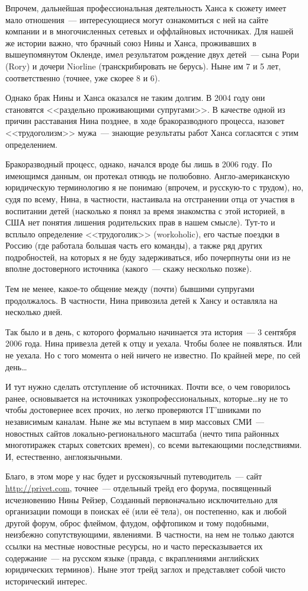 Впрочем, дальнейшая профессиональная деятельность Ханса к сюжету имеет мало отношения~--- интересующиеся могут ознакомиться с ней на сайте компании и в многочисленных сетевых и оффлайновых источниках. Для нашей же истории важно, что брачный союз Нины и Ханса, проживавших в вышеупомянутом Окленде, имел результатом рождение двух детей~--- сына Рори (Rory) и дочери Niorline (транскрибировать не берусь). Ныне им 7 и 5 лет, соответственно (точнее, уже скорее 8 и 6). 

Однако брак Нины и Ханса оказался не таким долгим. В 2004 году они становятся <<раздельно проживающими супругами>>. В качестве одной из причин расставания Нина позднее, в ходе бракоразводного процесса, назовет <<трудоголизм>> мужа~--- знающие результаты работ Ханса согласятся с этим определением. 

Бракоразводный процесс, однако, начался вроде бы лишь в 2006 году. По имеющимся данным, он протекал отнюдь не полюбовно. Англо-американскую юридическую терминологию я не понимаю (впрочем, и русскую-то с трудом), но, судя по всему, Нина, в частности, настаивала на отстранении отца от участия в воспитании детей (насколько я понял за время знакомства с этой историей, в США нет понятия лишения родительских прав в нашем смысле). Тут-то и всплыло определение <<трудоголик>> (workoholic), его частые поездки в Россию (где работала большая часть его команды), а также ряд других подробностей, на которых я не буду задерживаться, ибо почерпнуты они из не вполне достоверного источника (какого~--- скажу несколько позже). 

Тем не менее, какое-то общение между (почти) бывшими супругами продолжалось. В частности, Нина привозила детей к Хансу и оставляла на несколько дней. 

Так было и в день, с которого формально начинается эта история~--- 3 сентября 2006 года. Нина привезла детей к отцу и уехала. Чтобы более не появляться. Или не уехала. Но с того момента о ней ничего не известно. По крайней мере, по сей день\dots 

И тут нужно сделать отступление об источниках. Почти все, о чем говорилось ранее, основывается на источниках узкопрофессиональных, которые\dots ну не то чтобы достовернее всех прочих, но легко проверяются IT'шниками по независимым каналам. Ныне же мы вступаем в мир массовых СМИ~--- новостных сайтов локально-регионального масштаба (нечто типа районных многотиражек старых советских времен), со всеми вытекающими последствиями. И, естественно, англоязычными. 

Благо, в этом море у нас будет и русскоязычный путеводитель~--- сайт \url{http://privet.com}, точнее~--- отдельный трейд его форума, посвященный исчезновению Нины Рейзер, Созданный первоначально исключительно для организации помощи в поисках её (или её тела), он постепенно, как и любой другой форум, оброс флеймом, флудом, оффтопиком и тому подобными, неизбежно сопутствующими, явлениями. В частности, на нем не только даются ссылки на местные новостные ресурсы, но и часто пересказывается их содержание~--- на русском языке (правда, с вкраплениями английских юридических терминов). Ныне этот трейд заглох и представляет собой чисто исторический интерес. 

